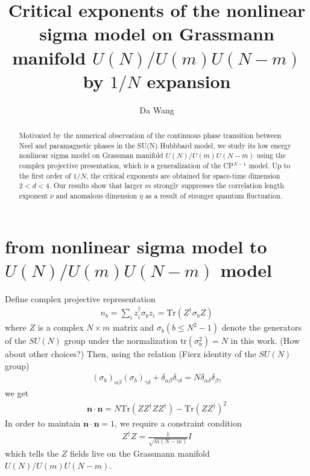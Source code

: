 \documentclass[aps,notitlepage]{revtex4-1}
\newcommand{\bea}{\begin{eqnarray}}
\newcommand{\eea}{\end{eqnarray}}
\newcommand{\bn}{\mathbf{n}}
\begin{document}
\title{Critical exponents of the nonlinear sigma model on Grassmann manifold $U(N)/U(m)U(N-m)$ by $1/N$ expansion}
\author{Da Wang}
\begin{abstract}
	Motivated by the numerical observation of the continuous phase transition between Neel and paramagnetic phases in the SU(N) Hubbbard model, we study its low energy nonlinear sigma model on Grassman manifold $U(N)/U(m)U(N-m)$ using the complex projective presentation, which is a generalization of the CP$^{N-1}$ model. Up to the first order of $1/N$, the critical exponents are obtained for space-time dimension $2<d<4$. Our results show that larger $m$ strongly suppresses the correlation length exponent $\nu$ and anomalous dimension $\eta$ as a result of stronger quantum fluctuation.
\end{abstract}
\maketitle



\section{from nonlinear sigma model to $U(N)/U(m)U(N-m)$ model}
Define complex projective representation \bea n_b=\sum_i z_i^\dag \sigma_b z_i=\mathrm{Tr}(Z^\dag\sigma_b Z) \eea  where $Z$ is a complex $N\times m$ matrix and $\sigma_b (b\le N^2-1)$ denote the generators of the $SU(N)$ group under the normalization $\mathrm{tr}(\sigma_b^2)=N$ in this work. ({\color{red}How about other choices?}) Then, using the relation (Fierz identity of the $SU(N)$ group) 
\bea (\sigma_b)_{\alpha\beta} (\sigma_b)_{\gamma\delta}+\delta_{\alpha\beta}\delta_{\gamma\delta}=N\delta_{\alpha\delta}\delta_{\beta\gamma} \eea
we get
\bea \bn\cdot\bn = N\mathrm{Tr}(ZZ^\dag Z Z^\dag)-\mathrm{Tr}(ZZ^\dag)^2 \eea
In order to maintain $\bn\cdot\bn=1$, we require a constraint condition \bea Z^\dag Z=\frac{1}{\sqrt{m(N-m)}}I \label{eq:normalizeZ}\eea
which tells the $Z$ fields live on the Grassmann manifold $U(N)/U(m)U(N-m)$. 
\end{document}
